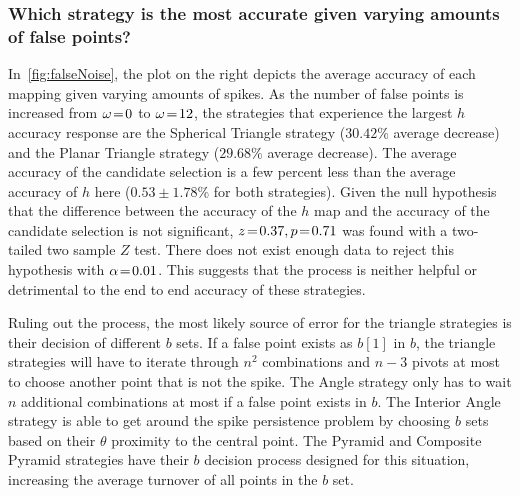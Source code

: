 \subsubsection{Which strategy is the most accurate given varying amounts of false points?}
%
%
%
%
In~\autoref{fig:falseNoise}, the plot on the right depicts the average accuracy of each mapping given varying amounts of spikes.
As the number of false points is increased from $\omega \!=\! 0$ to $\omega \!=\! 12$, the strategies that experience the largest $h$ accuracy response are the Spherical Triangle strategy ($30.42\%$ average decrease) and the Planar Triangle strategy ($29.68\%$ average decrease).
The average accuracy of the candidate selection is a few percent less than the average accuracy of $h$ here ($0.53\!\pm\!1.78\%$ for both strategies).
Given the null hypothesis that the difference between the accuracy of the $h$ map and the accuracy of the candidate selection is not significant, $z \!=\! 0.37, p \!=\! 0.71$ was found with a two-tailed two sample $Z$ test.
There does not exist enough data to reject this hypothesis with $\alpha \!=\! 0.01$.
This suggests that the  process is neither helpful or detrimental to the end to end accuracy of these strategies.

Ruling out the  process, the most likely source of error for the triangle strategies is their decision of different $b$ sets.
If a false point exists as $b[1]$ in $b$, the triangle strategies will have to iterate through $n^2$ combinations and $n - 3$ pivots at most to choose another point that is not the spike.
The Angle strategy only has to wait $n$ additional combinations at most if a false point exists in $b$.
The Interior Angle strategy is able to get around the spike persistence problem by choosing $b$ sets based on their $\theta$ proximity to the central point.
The Pyramid and Composite Pyramid strategies have their $b$ decision process designed for this situation, increasing the average turnover of all points in the $b$ set.

